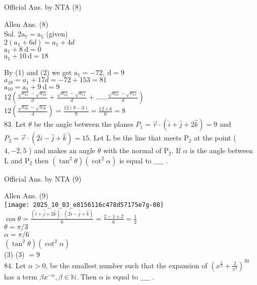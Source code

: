 \documentclass[10pt]{article}
\begin{document}
Official Ans. by NTA (8)

Allen Ans. (8)\\
Sol. \(2 \mathrm{a}_{7}=\mathrm{a}_{5}\) (given)\\
\(2\left(a_{1}+6 d\right)=a_{1}+4 d\)\\
\(\mathrm{a}_{1}+8 \mathrm{~d}=0\)\\
\(\mathrm{a}_{1}+10 \mathrm{~d}=18\)

By (1) and (2) we get \(\mathrm{a}_{1}=-72, \mathrm{~d}=9\)\\
\(a_{18}=a_{1}+17 d=-72+153=81\)\\
\(\mathrm{a}_{10}=\mathrm{a}_{1}+9 \mathrm{~d}=9\)\\
\(12\left(\frac{\sqrt{a_{11}}-\sqrt{a_{10}}}{d}+\frac{\sqrt{a_{12}}-\sqrt{a_{11}}}{d}+\ldots \ldots \frac{\sqrt{a_{18}}-\sqrt{a_{17}}}{d}\right)\)\\
\(12\left(\frac{\sqrt{\mathrm{a}_{18}}-\sqrt{\mathrm{a}_{10}}}{\mathrm{~d}}\right)=\frac{12(9-3)}{9}=\frac{12 \times 6}{6}=8\)\\
83. Let \(\theta\) be the angle between the planes \(P_{1}=\vec{r} \cdot(\hat{i}+\hat{j}+2 \hat{k})=9\) and \(P_{2}=\vec{r} \cdot(2 \hat{i}-\hat{j}+\hat{k})=15\). Let L be the line that meets \(\mathrm{P}_{2}\) at the point ( \(4,-2,5\) ) and makes an angle \(\theta\) with the normal of \(\mathrm{P}_{2}\). If \(\alpha\) is the angle between L and \(\mathrm{P}_{2}\) then \(\left(\tan ^{2} \theta\right)\left(\cot ^{2} \alpha\right)\) is equal to \(\_\_\_\_\) .

Official Ans. by NTA (9)

Allen Ans. (9)\\
\texttt{[image: 2025\_10\_03\_e8156116c478d57175e7g-08]}\\
\(\cos \theta=\frac{(\hat{i}+\hat{j}+2 \hat{k}) \cdot(2 \hat{i}-\hat{j}+\hat{k})}{6}=\frac{2-1+2}{6}=\frac{1}{2}\)\\
\(\theta=\pi / 3\)\\
\(\alpha=\pi / 6\)\\
\(\left(\tan ^{2} \theta\right)\left(\cot ^{2} \alpha\right)\)\\
(3) (3) \(=9\)\\
84. Let \(\alpha>0\), be the smallest number such that the expansion of \(\left(x^{\frac{2}{3}}+\frac{2}{x^{3}}\right)^{30}\) has a term \(\beta x^{-\alpha}, \beta \in \mathbb{N}\). Then \(\alpha\) is equal to \(\_\_\_\_\) .
\end{document}
